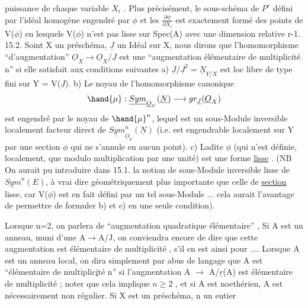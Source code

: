 
puissance de chaque variable $X_i$ . Plus précisément, le sous-schéma
de $P^r$ défini par l'idéal homogène engendré par  $\phi$ et les $\frac{\partial\phi}{\partial X_i}$ est
exactement formé des points de V($\phi$) en lesquels V($\phi$) n'est pas lisse sur
Spec(A) avec une dimension relative r-1.
15.2. Soint X un préschéma, $\underline{J}$ un Idéal   sur X, nous dirons que
l'homomorphisme ``d'augmentation'' $\underline{O}_X \to \underline{O}_X/\underline{J}$ est une ``augmentation
élémentaire de multiplicité n'' si elle satisfait aux conditions suivantes
a) $\underline{J}/\underline{J}^2 = \underline{N}_{Y/X}$ est loc libre de type fini sur Y = V($\underline{J}$).
b) Le noyau de l'homomorphisme canonique
\[ \hand{\mu} : \underline{Sym}_{\underline{O}_Y}(\underline{N}) \longrightarrow gr_{\underline{J}}(\underline{O}_X) \]
est engendré par le noyau  de $\hand{\mu}^n$, lequel est un sous-Module inversible
localement facteur direct de $\underline{Sym}^n_{\underline{O}_Y}(\underline{N})$ (i.e. est engendrable localement
sur Y par une section $\phi$ qui ne s'annule en aucun point).
c) Ladite $\phi$ (qui n'est définie, localement, que modulo multiplication
par une unité) est une forme \uline{lisse} . (NB On aurait pu introduire dans
\margin{\textbar}15.1. la notion de sous-Module inversible lisse de $\underline{Sym}^n(E)$, à vrai dire
géométriquement plus importante que celle de \uline{section} lisse, car V($\phi$) est
en fait défini par un tel sous-Module ...\xout{;} cela aurait l'avantage de
permettre de formuler b) et c) en une seule condition).

Lorsque n=2, on parlera de ``augmentation  quadratique élémentaire'' ,
Si A est un anneau,  muni d'une  A$\to$A/J,
on conviendra encore de dire que cette augmentation est élémentaire de
multiplicité  , s'il en est ainsi pour .... Lorsque A est un anneau
local, on dira simplement par abus de langage que A est ``élémentaire de
multiplic\uline{i}té n'' si l'augmentation A $\to$ A/$\underline{r}$(A) est élémentaire de
multiplicité ; noter que cela implique $n \geqslant 2$ , et si A est noethérien,
A est nécessairement non régulier. Si X est un préschéma, n un entier

